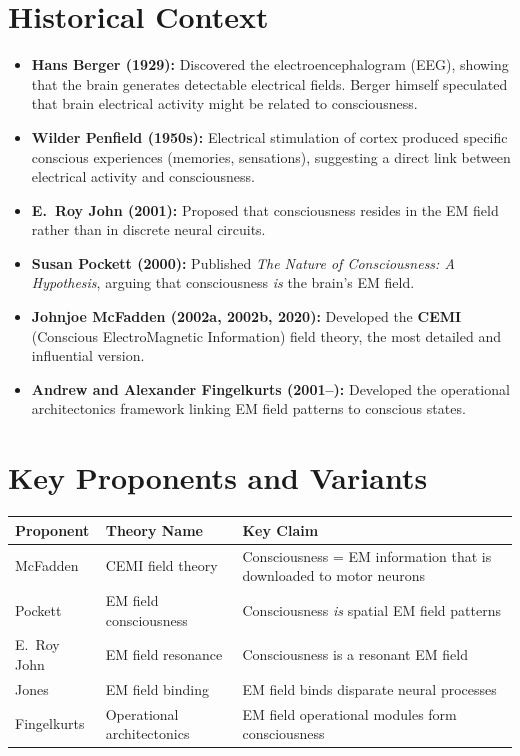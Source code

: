 \documentclass[11pt,a4paper]{report}
\begin{document}
\section{Historical Context}

\begin{itemize}[leftmargin=1.5em]
  \item \textbf{Hans Berger (1929):} Discovered the electroencephalogram (EEG), showing that the brain generates detectable electrical fields. Berger himself speculated that brain electrical activity might be related to consciousness.
  \item \textbf{Wilder Penfield (1950s):} Electrical stimulation of cortex produced specific conscious experiences (memories, sensations), suggesting a direct link between electrical activity and consciousness.
  \item \textbf{E.\ Roy John (2001):} Proposed that consciousness resides in the EM field rather than in discrete neural circuits.
  \item \textbf{Susan Pockett (2000):} Published \textit{The Nature of Consciousness: A Hypothesis}, arguing that consciousness \emph{is} the brain's EM field.
  \item \textbf{Johnjoe McFadden (2002a, 2002b, 2020):} Developed the \textbf{CEMI} (Conscious ElectroMagnetic Information) field theory, the most detailed and influential version.
  \item \textbf{Andrew and Alexander Fingelkurts (2001--):} Developed the operational architectonics framework linking EM field patterns to conscious states.
\end{itemize}

\section{Key Proponents and Variants}

\begin{center}
\renewcommand{\arraystretch}{1.3}
\begin{tabular}{>{\raggedright}p{3cm} >{\raggedright}p{4cm} >{\raggedright\arraybackslash}p{6cm}}
  \toprule
  \textbf{Proponent} & \textbf{Theory Name} & \textbf{Key Claim} \\
  \midrule
  McFadden & CEMI field theory & Consciousness = EM information that is downloaded to motor neurons \\
  Pockett & EM field consciousness & Consciousness \emph{is} spatial EM field patterns \\
  E.\ Roy John & EM field resonance & Consciousness is a resonant EM field \\
  Jones & EM field binding & EM field binds disparate neural processes \\
  Fingelkurts & Operational architectonics & EM field operational modules form consciousness \\
  \bottomrule
\end{tabular}
\end{center}
\end{document}
